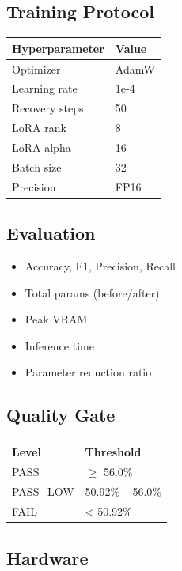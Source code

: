 \subsection{Training Protocol}

\begin{table}[H]
\centering
\small
\begin{tabular}{ll}
\toprule
\textbf{Hyperparameter} & \textbf{Value} \\
\midrule
Optimizer & AdamW \\
Learning rate & 1e-4 \\
Recovery steps & 50 \\
LoRA rank & 8 \\
LoRA alpha & 16 \\
Batch size & 32 \\
Precision & FP16 \\
\bottomrule
\end{tabular}
\end{table}

\subsection{Evaluation}

\begin{itemize}
\item Accuracy, F1, Precision, Recall
\item Total params (before/after)
\item Peak VRAM
\item Inference time
\item Parameter reduction ratio

\end{itemize}
\subsection{Quality Gate}

\begin{table}[H]
\centering
\small
\begin{tabular}{ll}
\toprule
\textbf{Level} & \textbf{Threshold} \\
\midrule
PASS & $\ge$ 56.0\% \\
PASS\_LOW & 50.92\% -- 56.0\% \\
FAIL & \textless{} 50.92\% \\
\bottomrule
\end{tabular}
\end{table}

\subsection{Hardware}

